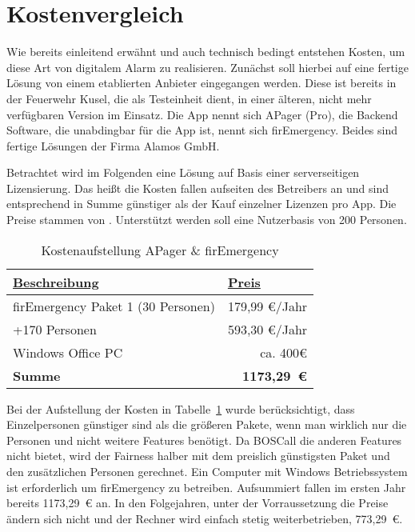 \section{Kostenvergleich}
\label{sec:kostenvergleich}
Wie bereits einleitend erwähnt und auch technisch bedingt entstehen Kosten, um diese Art von digitalem Alarm zu realisieren. Zunächst soll hierbei auf eine fertige Lösung von einem etablierten Anbieter eingegangen werden. Diese ist bereits in der Feuerwehr Kusel, die als Testeinheit dient, in einer älteren, nicht mehr verfügbaren Version im Einsatz. Die App nennt sich APager (Pro), die Backend Software, die unabdingbar für die App ist, nennt sich firEmergency. Beides sind fertige Lösungen der Firma Alamos GmbH.

Betrachtet wird im Folgenden eine Lösung auf Basis einer serverseitigen Lizensierung. Das heißt die Kosten fallen aufseiten des Betreibers an und sind entsprechend in Summe günstiger als der Kauf einzelner Lizenzen pro App. Die Preise stammen von \cite{Alamos:FE2Pricing}. Unterstützt werden soll eine Nutzerbasis von 200 Personen.
\begin{table}[H]
	\centering
	\caption{Kostenaufstellung APager \& firEmergency}
	\label{tbl:FE2Pricing}
	\begin{tabular}{|l|r|}
		\hline
		{\ul \textbf{Beschreibung}}        & \multicolumn{1}{l|}{{\ul \textbf{Preis}}} \\ \hline
		firEmergency Paket 1 (30 Personen) & 179,99 €/Jahr                             \\ \hline
		+170 Personen                      & 593,30 €/Jahr                             \\ \hline
		Windows Office PC                  & ca. 400€                                  \\ \hline\hline
		\textbf{Summe}                  & \textbf{1173,29~€}                                  \\ \hline
	\end{tabular}
\end{table}

Bei der Aufstellung der Kosten in Tabelle~\ref{tbl:FE2Pricing} wurde berücksichtigt, dass Einzelpersonen günstiger sind als die größeren Pakete, wenn man wirklich nur die Personen und nicht weitere Features benötigt. Da BOSCall die anderen Features nicht bietet, wird der Fairness halber mit dem preislich günstigsten Paket und den zusätzlichen Personen gerechnet. Ein Computer mit Windows Betriebssystem ist erforderlich um firEmergency zu betreiben.\cite{Alamos:FE2SystemRequirements} Aufsummiert fallen im ersten Jahr bereits 1173,29~€ an. In den Folgejahren, unter der Vorraussetzung die Preise ändern sich nicht und der Rechner wird einfach stetig weiterbetrieben, 773,29~€.

